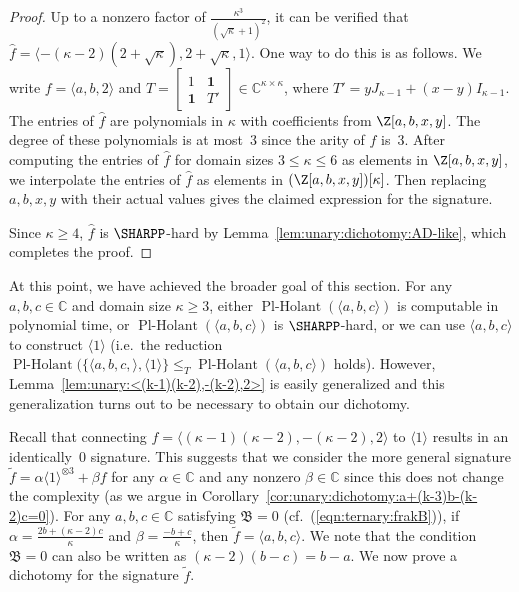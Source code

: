 \documentclass[11pt]{article}
\newcommand{\PlHolant}{\operatorname{Pl-Holant}}
\begin{document}
\begin{proof}
 Up to a nonzero factor of $\frac{\kappa^3}{(\sqrt{\kappa} + 1)^2}$,
 it can be verified that $\widehat{f} = \langle -(\kappa - 2) (2 + \sqrt{\kappa}), 2 + \sqrt{\kappa}, 1 \rangle$.
 One way to do this is as follows.
 We write $f = \langle a,b,2 \rangle$ and
 $T = \left[\begin{smallmatrix} 1 & \mathbf{1} \\ \mathbf{1} & T' \end{smallmatrix}\right] \in \mathbb{C}^{\kappa \times \kappa}$,
 where $T' = y J_{\kappa-1} + (x - y) I_{\kappa-1}$.
 The entries of $\widehat{f}$ are polynomials in $\kappa$ with coefficients from $\Z[a,b,x,y]$.
 The degree of these polynomials is at most~$3$ since the arity of $f$ is~$3$.
 After computing the entries of $\widehat{f}$ for domain sizes $3 \le \kappa \le 6$ as elements in $\Z[a,b,x,y]$,
 we interpolate the entries of $\widehat{f}$ as elements in $(\Z[a,b,x,y])[\kappa]$.
 Then replacing $a,b,x,y$ with their actual values gives the claimed expression for the signature.
 
 Since $\kappa \ge 4$, $\widehat{f}$ is $\SHARPP$-hard by Lemma~\ref{lem:unary:dichotomy:AD-like},
 which completes the proof.
\end{proof}

At this point,
we have achieved the broader goal of this section.
For any $a,b,c \in \mathbb{C}$ and domain size $\kappa \ge 3$,
either $\PlHolant(\langle a,b,c \rangle)$ is computable in polynomial time,
or $\PlHolant(\langle a,b,c \rangle)$ is $\SHARPP$-hard,
or we can use $\langle a,b,c \rangle$ to construct $\langle 1 \rangle$
(i.e.~the reduction $\PlHolant(\{\langle a,b,c, \rangle, \langle 1 \rangle\} \le_T \PlHolant(\langle a,b,c \rangle)$ holds).
However, Lemma~\ref{lem:unary:<(k-1)(k-2),-(k-2),2>} is easily generalized and this generalization turns out to be necessary to obtain our dichotomy.

Recall that connecting $f = \langle (\kappa - 1) (\kappa - 2), -(\kappa - 2), 2 \rangle$ to $\langle 1 \rangle$ results in an identically~$0$ signature.
This suggests that we consider the more general signature $\widetilde{f} = \alpha \langle 1 \rangle^{\otimes 3} + \beta f$
for any $\alpha \in \mathbb{C}$ and any nonzero $\beta \in \mathbb{C}$ since this does not change the complexity (as we argue in Corollary~\ref{cor:unary:dichotomy:a+(k-3)b-(k-2)c=0}).
For any $a,b,c \in \mathbb{C}$ satisfying $\mathfrak{B} = 0$ (cf.~(\ref{eqn:ternary:frakB})),
if $\alpha = \frac{2 b + (\kappa - 2) c}{\kappa}$ and $\beta = \frac{-b + c}{\kappa}$,
then $\widetilde{f} = \langle a,b,c \rangle$.
We note that the condition $\mathfrak{B} = 0$ can also be written as $(\kappa - 2) (b - c) = b - a$.
We now prove a dichotomy for the signature $\widetilde{f}$.
\end{document}
